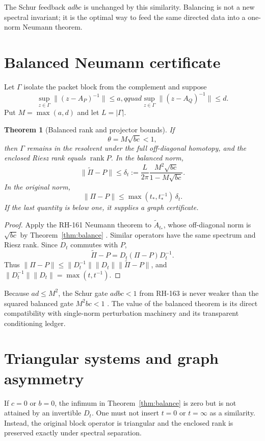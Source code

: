 \documentclass[12pt]{article}
\newtheorem{theorem}{Theorem}
\newcommand{\norm}[1]{\lVert#1\rVert}
\begin{document}
The Schur feedback $adbc$ is unchanged by this similarity.  Balancing is not
a new spectral invariant; it is the optimal way to feed the same directed
data into a one-norm Neumann theorem.

\section{Balanced Neumann certificate}
Let $\Gamma$ isolate the packet block from the complement and suppose
\[
 \sup_{z\in\Gamma}\norm{(z-A_P)^{-1}}\le a,qquad
 \sup_{z\in\Gamma}\norm{(z-A_Q)^{-1}}\le d.
\]
Put $M=\max(a,d)$ and let $L=|\Gamma|$.

\begin{theorem}[Balanced rank and projector bounds]\label{thm:certificate}
If
\[
 \theta=M\sqrt{bc}<1,
\]
then $\Gamma$ remains in the resolvent under the full off-diagonal homotopy,
and the enclosed Riesz rank equals $\operatorname{rank}P$.  In the balanced
norm,
\[
 \norm{\widetilde\Pi-P}
 \le \delta_t:=\frac{L}{2\pi}
 \frac{M^2\sqrt{bc}}{1-M\sqrt{bc}}.
\]
In the original norm,
\[
 \norm{\Pi-P}\le
 \max(t_*,t_*^{-1})\,\delta_t.
\]
If the last quantity is below one, it supplies a graph certificate.
\end{theorem}
\begin{proof}
Apply the RH-161 Neumann theorem to $\widetilde A_{t_*}$, whose off-diagonal
norm is $\sqrt{bc}$ by Theorem~\ref{thm:balance} \citep{WangRH161}.  Similar
operators have the same spectrum and Riesz rank.  Since $D_t$ commutes with
$P$,
\[
 \widetilde\Pi-P=D_t(\Pi-P)D_t^{-1}.
\]
Thus
$\norm{\Pi-P}\le\norm{D_t^{-1}}\norm{D_t}\norm{\widetilde\Pi-P}$,
and $\norm{D_t^{-1}}\norm{D_t}=\max(t,t^{-1})$.
\end{proof}

Because $ad\le M^2$, the Schur gate $adbc<1$ from RH-163 is never weaker
than the squared balanced gate $M^2bc<1$ \citep{WangRH163}.  The value of the
balanced theorem is its direct compatibility with single-norm perturbation
machinery and its transparent conditioning ledger.

\section{Triangular systems and graph asymmetry}
If $c=0$ or $b=0$, the infimum in Theorem~\ref{thm:balance} is zero but is not
attained by an invertible $D_t$.  One must not insert $t=0$ or $t=\infty$ as
a similarity.  Instead, the original block operator is triangular and the
enclosed rank is preserved exactly under spectral separation.
\end{document}
